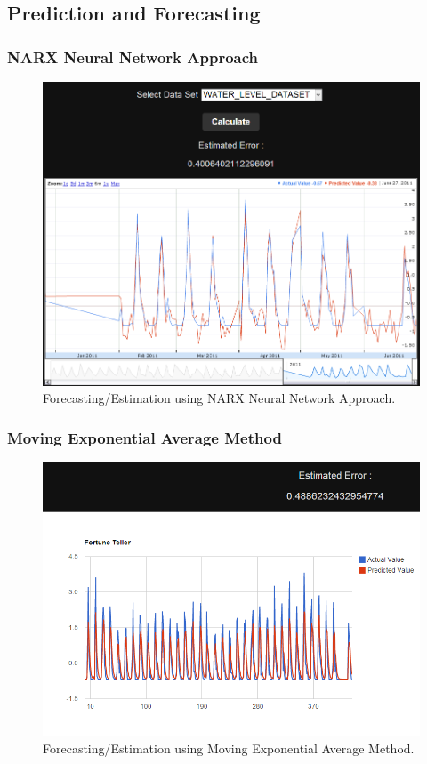 \documentclass[12pt]{report}
\begin{document}
\subsection{Prediction and Forecasting}
\subsubsection{NARX Neural Network Approach}
\begin{figure}[h!]

  \centering
    \includegraphics[scale=0.35]{./screenshots/result_fort_NN.png}
  \caption{Forecasting/Estimation using NARX Neural Network Approach.}
\end{figure}

\subsubsection{Moving Exponential Average Method}
\begin{figure}[h!]
  \centering
    \includegraphics[scale=0.55]{./screenshots/result_fort_MEA.png}
  \caption{Forecasting/Estimation using Moving Exponential Average Method.}
\end{figure}
\end{document}
